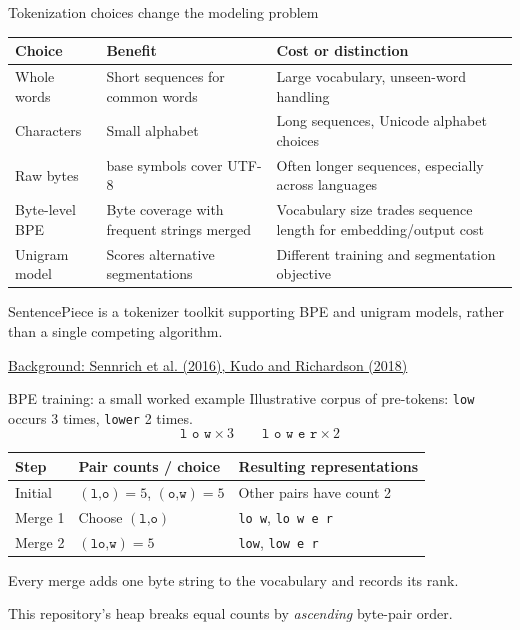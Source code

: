 \documentclass[11pt,aspectratio=169]{beamer}
\newcommand{\paper}[2]{\par{\scriptsize\color{muted}\href{#2}{#1}\par}}
\begin{document}
\begin{frame}{Tokenization choices change the modeling problem}
\small
\begin{tabular}{@{}>{\raggedright\arraybackslash}p{}>{\raggedright\arraybackslash}p{}>{\raggedright\arraybackslash}p{}@{}}
\toprule
Choice & Benefit & Cost or distinction\\\midrule
Whole words & Short sequences for common words & Large vocabulary, unseen-word handling\\[2mm]
Characters & Small alphabet & Long sequences, Unicode alphabet choices\\[2mm]
Raw bytes & 256 base symbols cover UTF-8 & Often longer sequences, especially across languages\\[2mm]
Byte-level BPE & Byte coverage with frequent strings merged & Vocabulary size trades sequence length for embedding/output cost\\[2mm]
Unigram model & Scores alternative segmentations & Different training and segmentation objective\\\bottomrule
\end{tabular}\par
\par\vspace{3mm}
SentencePiece is a tokenizer toolkit supporting BPE and unigram models, rather than a single competing algorithm.
\paper{Background: Sennrich et al. (2016), Kudo and Richardson (2018)}{https://arxiv.org/abs/1808.06226}
\end{frame}

\begin{frame}{BPE training: a small worked example}
Illustrative corpus of pre-tokens: \texttt{low} occurs 3 times, \texttt{lower} 2 times.
\[
\texttt{l o w}\times3\qquad\texttt{l o w e r}\times2
\]
\begin{tabular}{@{}lll@{}}
\toprule
Step & Pair counts / choice & Resulting representations\\\midrule
Initial & $(\texttt{l,o})=5$, $(\texttt{o,w})=5$ & Other pairs have count 2\\[2mm]
Merge 1 & Choose $(\texttt{l,o})$ & \texttt{lo w}, \texttt{lo w e r}\\[2mm]
Merge 2 & $(\texttt{lo,w})=5$ & \texttt{low}, \texttt{low e r}\\\bottomrule
\end{tabular}\par
\par\vspace{3mm}
Every merge adds one byte string to the vocabulary and records its rank.\par
This repository's heap breaks equal counts by \emph{ascending} byte-pair order.
\end{frame}
\end{document}
